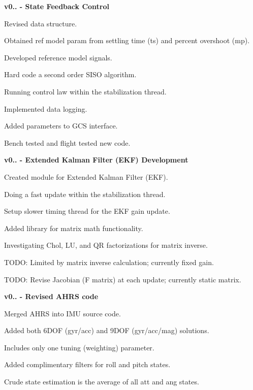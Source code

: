 \begin{DoxyItemize}
\item {\bfseries  v0.. -\/ State Feedback Control } 
\begin{DoxyItemize}
\item Revised data structure.  
\item Obtained ref model param from settling time (ts) and percent overshoot (mp).  
\item Developed reference model signals.  
\item Hard code a second order S\+I\+SO algorithm.  
\item Running control law within the stabilization thread.  
\item Implemented data logging.  
\item Added parameters to G\+CS interface.  
\item Bench tested and flight tested new code.  
\end{DoxyItemize}
\item {\bfseries  v0.. -\/ Extended Kalman Filter (E\+KF) Development } 
\begin{DoxyItemize}
\item Created module for Extended Kalman Filter (E\+KF).  
\item Doing a fast update within the stabilization thread.  
\item Setup slower timing thread for the E\+KF gain update.  
\item Added library for matrix math functionality.  
\item Investigating Chol, LU, and QR factorizations for matrix inverse.  
\item T\+O\+DO\+: Limited by matrix inverse calculation; currently fixed gain.  
\item T\+O\+DO\+: Revise Jacobian (F matrix) at each update; currently static matrix.  
\end{DoxyItemize}
\item {\bfseries  v0.. -\/ Revised A\+H\+RS code } 
\begin{DoxyItemize}
\item Merged A\+H\+RS into I\+MU source code.  
\item Added both 6\+D\+OF (gyr/acc) and 9\+D\+OF (gyr/acc/mag) solutions.  
\item Includes only one tuning (weighting) parameter.  
\item Added complimentary filters for roll and pitch states.  
\item Crude state estimation is the average of all att and ang states.  

\end{DoxyItemize}
\end{DoxyItemize}
